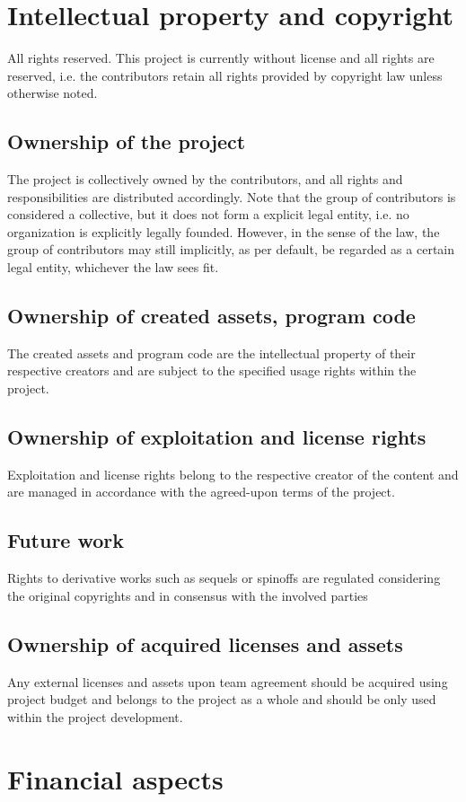 \documentclass{article}
\begin{document}
\section{Intellectual property and copyright}
All rights reserved.
This project is currently without license and all rights are reserved, i.e. the contributors retain all rights provided by copyright law unless otherwise noted.
\subsection{Ownership of the project}
The project is collectively owned by the contributors, and all rights and responsibilities are distributed accordingly.
Note that the group of contributors is considered a collective, but it does not form a explicit legal entity, i.e. no organization is explicitly legally founded.
However, in the sense of the law, the group of contributors may still implicitly, as per default, be regarded as a certain legal entity, whichever the law sees fit.
\subsection{Ownership of created assets, program code}
The created assets and program code are the intellectual property of their respective creators and are subject to the specified usage rights within the project.
\subsection{Ownership of exploitation and license rights}
Exploitation and license rights belong to the respective creator of the content and are managed in accordance with the agreed-upon terms of the project.
\subsection{Future work}
Rights to derivative works such as sequels or spinoffs are regulated considering the original copyrights and in consensus with the involved parties
\subsection{Ownership of acquired licenses and assets}
Any external licenses and assets upon team agreement should be acquired using project budget and belongs to the project as a whole and should be only used within the project development.

\section{Financial aspects}
\end{document}
